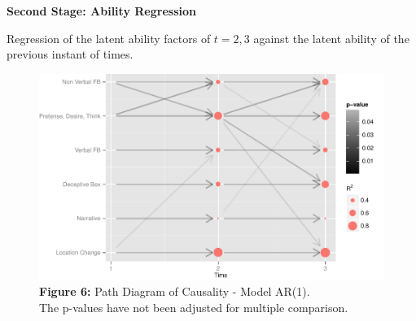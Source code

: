 \documentclass[portrait,final,archD,fontscale=0.477]{baposter}
\begin{document}
\begin{poster}
{\begin{multicols}{2}
\end{multicols}

\vspace{-0.5em}
\begin{tcolorbox}
\textbf{{\large Second Stage: Ability Regression}}
\end{tcolorbox}
Regression of the latent ability factors of $t=2,3$ against the latent ability of the previous instant of times.
\vspace{-0.5em}

%
%

\begin{figure}[H]
\centering
\includegraphics[scale=0.7]{./images-posterlatinr/causal_AR1}\\
\textbf{Figure 6:} Path Diagram of Causality - Model AR(1). \\
The p-values have not been adjusted for multiple comparison.
\end{figure}

}

\end{poster}
\end{document}

